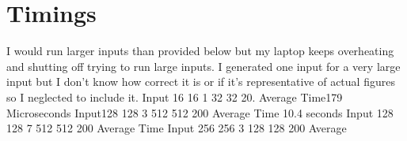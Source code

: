 \documentclass[14pt]{article} %
\begin{document}
\section{Timings}
I would run larger inputs than provided below but my laptop keeps overheating and shutting off trying to run large inputs. I generated one input for a very large input but I don't know how correct it is or if it's representative of actual figures so I neglected to include it.
\newline
Input​ 16 16 1 32 32 20.
\newline
Average Time​179 Microseconds 
\newline
\newline
Input​128 128 3 512 512 200
\newline
Average Time​ 10.4 seconds
\newline
\newline
Input​ 128 128 7 512 512 200
\newline
Average Time​
\newline
\newline
Input 256 256 3 128 128 200
\newline
Average
 
\end{document}
